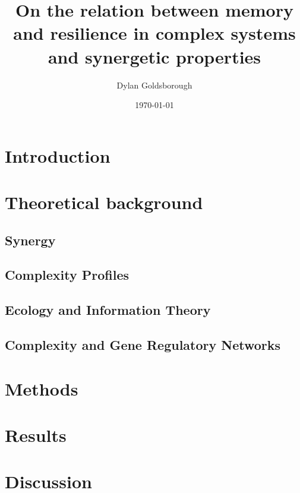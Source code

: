 \documentclass{article}
\title{On the relation between memory and resilience in complex systems and synergetic properties}
\author{Dylan Goldsborough}
\date{\today}
\begin{document}
\maketitle



\section{Introduction}



\section{Theoretical background}

\subsection{Synergy}



\subsection{Complexity Profiles}



\subsection{Ecology and Information Theory}


\subsection{Complexity and Gene Regulatory Networks}



\section{Methods}



\section{Results}



\section{Discussion}




%



\end{document}
